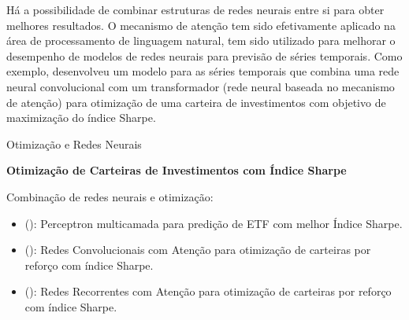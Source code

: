 {        \ipar Há a possibilidade de combinar estruturas de redes neurais entre si para obter melhores resultados. O mecanismo de atenção tem sido efetivamente aplicado na área de processamento de linguagem natural, tem sido utilizado para melhorar o desempenho de modelos de redes neurais para previsão de séries temporais. Como exemplo,  desenvolveu um modelo para as séries temporais que combina uma rede neural convolucional com um transformador (rede neural baseada no mecanismo de atenção) para otimização de uma carteira de investimentos com objetivo de maximização do índice Sharpe.


    }





    \begin{frame}{Otimização e Redes Neurais}

        \LARGE \textbf{Otimização de Carteiras de Investimentos com Índice Sharpe}

        Combinação de redes neurais e otimização:

        \begin{itemize}
            \item \citeauthor{vukovic2020neural}(\citeyear{vukovic2020neural}): Perceptron multicamada para predição de ETF com melhor Índice Sharpe.
            \item \citeauthor{sun2022deep}(\citeyear{sun2022deep}): Redes Convolucionais com Atenção para otimização de carteiras por reforço com índice Sharpe.
            \item \citeauthor{cao2020delafo}(\citeyear{cao2020delafo}): Redes Recorrentes com Atenção para otimização de carteiras por reforço com índice Sharpe.
        \end{itemize}
                    

    \end{frame}
